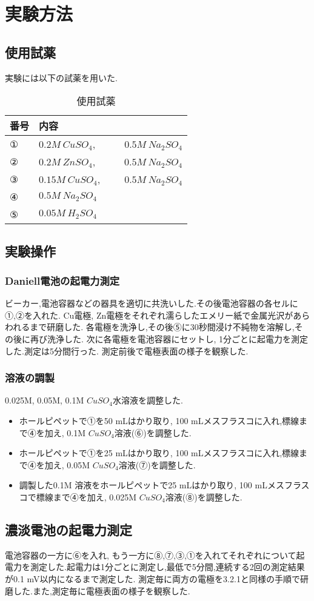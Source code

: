 \section{実験方法}
\subsection{使用試薬}
実験には以下の試薬を用いた.
\begin{table}[h]
   \caption{使用試薬}
   \label{tab:siyaku}
   \centering
   \begin{tabular}{ll}
    \hline
    番号&内容\\
    \hline \hline
     ①&$0.2M\ CuSO_4$,~~~~~~$0.5M\ Na_2SO_4$\\
     ②&$0.2M\ ZnSO_4$,~~~~~~$0.5M\ Na_2SO_4$\\
     ③&$0.15M\ CuSO_4$,~~~~~$0.5M\ Na_2SO_4$\\
     ④&$0.5M\ Na_2SO_4$\\
     ⑤&$0.05M\ H_2SO_4$\\
     \hline
   \end{tabular}
\end{table}
\subsection{実験操作}
\subsubsection{Daniell電池の起電力測定}
ビーカー,電池容器などの器具を適切に共洗いした.その後電池容器の各セルに①,②を入れた.
Cu電極, Zn電極をそれぞれ濡らしたエメリー紙で金属光沢があらわれるまで研磨した.
各電極を洗浄し,その後⑤に30秒間浸け不純物を溶解し,その後に再び洗浄した.
次に各電極を電池容器にセットし, 1分ごとに起電力を測定した.測定は5分間行った.
測定前後で電極表面の様子を観察した.
\subsubsection{溶液の調製}
0.025M, 0.05M, 0.1M $CuSO_4$水溶液を調整した.
\begin{itemize}
  \item ホールピペットで①を50 \si{\milli L}はかり取り, 100 \si{\milli L}メスフラスコに入れ,標線まで④を加え, 0.1M $CuSO_4$溶液(⑥)を調整した.
  \item ホールピペットで①を25 \si{\milli L}はかり取り, 100 \si{\milli L}メスフラスコに入れ,標線まで④を加え, 0.05M $CuSO_4$溶液(⑦)を調整した.
  \item 調製した0.1M 溶液をホールピペットで25 \si{\milli L}はかり取り, 100 \si{\milli L}メスフラスコで標線まで④を加え, 0.025M $CuSO_4$溶液(⑧)を調整した.
\end{itemize}
\subsection{濃淡電池の起電力測定}
電池容器の一方に⑥を入れ, もう一方に⑧,⑦,③,①を入れてそれぞれについて起電力を測定した.起電力は1分ごとに測定し,最低で5分間,連続する2回の測定結果が0.1 \si{\milli\volt}以内になるまで測定した.
測定毎に両方の電極を3.2.1と同様の手順で研磨した.また,測定毎に電極表面の様子を観察した.